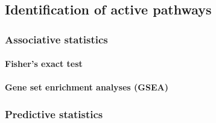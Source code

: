 \subsection{Identification of active pathways}
\subsubsection{Associative statistics}
\paragraph{Fisher's exact test}
\paragraph{Gene set enrichment analyses (GSEA)}
\subsubsection{Predictive statistics}

